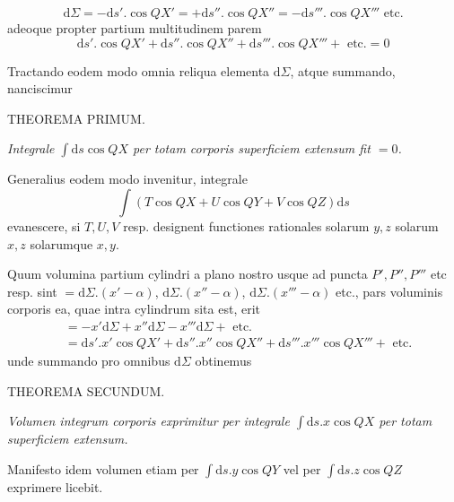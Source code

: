 \[
\mathrm{d}\Sigma=-\mathrm{d}s'.\cos QX'=+\mathrm{d}s''.\cos QX''=-\mathrm{d}s'''.\cos QX'''\text{ etc.}
\]
adeoque propter partium multitudinem parem
\[
\mathrm{d}s'.\cos QX'+\mathrm{d}s''.\cos QX''+\mathrm{d}s'''.\cos QX'''+\text{ etc.}=0
\]
\par
Tractando eodem modo omnia reliqua elementa $\mathrm{d}\Sigma$, atque summando, nanciscimur
\par\medskip{}
\begin{center}THEOREMA PRIMUM.\end{center}
\par
\textit{Integrale $\int\mathrm{d}s\cos QX$ per totam corporis superficiem extensum fit $=0$.}
\par
Generalius eodem modo invenitur, integrale
\[
\int(T\cos QX+U\cos QY+V\cos QZ)\mathrm{d}s
\]
evanescere, si $T,U,V$ resp. designent functiones rationales solarum $y,z$ solarum $x,z$ solarumque $x,y$.

\par
Quum volumina partium cylindri a plano nostro usque ad puncta $P',P'',P'''$ etc resp. sint $=\mathrm{d}\Sigma.(x'-\alpha)$, $\mathrm{d}\Sigma.(x''-\alpha)$, $\mathrm{d}\Sigma.(x'''-\alpha)$ etc., pars voluminis corporis ea, quae intra cylindrum sita est, erit
\[
\begin{aligned}
&=-x'\mathrm{d}\Sigma+x''\mathrm{d}\Sigma-x'''\mathrm{d}\Sigma+\text{ etc.}\\
&=\mathrm{d}s'.x'\cos QX'+\mathrm{d}s''.x''\cos QX''+\mathrm{d}s'''.x'''\cos QX'''+\text{ etc.}
\end{aligned}
\]
unde summando pro omnibus $\mathrm{d}\Sigma$ obtinemus
\par\medskip{}
\begin{center}THEOREMA SECUNDUM.\end{center}
\par
\textit{Volumen integrum corporis exprimitur per integrale $\int\mathrm{d}s.x\cos QX$ per totam superficiem extensum.}
\par
Manifesto idem volumen etiam per $\int\mathrm{d}s.y\cos QY$ vel per $\int\mathrm{d}s.z\cos QZ$ exprimere licebit.

